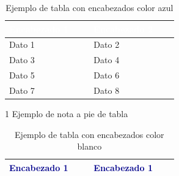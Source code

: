 \newpage

\begin{multicols}{2}

\begin{table}[H]

\caption{Ejemplo de tabla con encabezados color azul}
\label{tab:ejemplo_tabla_azul}

\begin{threeparttable}

{\small{}

\begin{tabular}{M{0.4\linewidth}M{0.4\linewidth}}\hline
    
    \sffamily\bfseries{}\textcolor{White}{Encabezado 1} & \sffamily\bfseries{}\textcolor{White}{Encabezado 2} \\ \hline
    
    Dato 1 & Dato 2 \\
    Dato 3 & Dato 4 \\
    Dato 5 & Dato 6 \\
    Dato 7 & Dato 8 \\

    \hline
\end{tabular}

}

\begin{tablenotes}\tiny %
    \item[1] Ejemplo de nota a pie de tabla
\end{tablenotes}

\end{threeparttable}
\end{table}



\begin{table}[H]

\caption{Ejemplo de tabla con encabezados color blanco}
\label{tab:ejemplo_tabla_blanco}

\begin{threeparttable}

{\small{}

\begin{tabular}{M{0.4\linewidth}M{0.4\linewidth}}\hline
    
    \sffamily\bfseries{}\textcolor{DarkBlue}{Encabezado 1} & \sffamily\bfseries{}\textcolor{DarkBlue}{Encabezado 1} \\ \hline
    

\end{tabular}}
\end{threeparttable}
\end{table}
\end{multicols}
